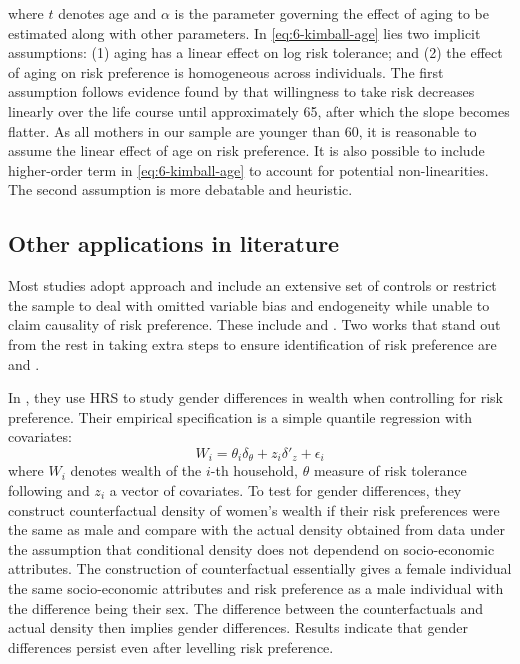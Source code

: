 \documentclass[]{article}
\begin{document}
where $t$ denotes age and $\alpha$ is the parameter governing the effect of aging to be estimated along with other parameters. In  \eqref{eq:6-kimball-age} lies two implicit assumptions: (1) aging has a linear effect on log risk tolerance; and (2) the effect of aging on risk preference is homogeneous across individuals. The first assumption follows evidence found by \citet{dohmen2017} that willingness to take risk decreases linearly over the life course until approximately 65, after which the slope becomes flatter. As all mothers in our sample are younger than 60, it is reasonable to assume the linear effect of age on risk preference. It is also possible to include higher-order term in \eqref{eq:6-kimball-age} to account for potential non-linearities. The second assumption is more debatable and heuristic.  

\subsection{Other applications in literature}
Most studies adopt \citet{kimball2008imputing} approach and include an extensive set of controls or restrict the sample to deal with omitted variable bias and endogeneity while unable to claim causality of risk preference. These include \citet{light2010divorce, brown2011self, brown2012parental, brown2013household} and \citet{yilmazer2015portfolio}. Two works that stand out from the rest in taking extra steps to ensure identification of risk preference are \citet{neelakantan2010gender} and \citet{cho2021endogenous}.

In \citet{neelakantan2010gender}, they use HRS to study gender differences in wealth when controlling for risk preference. Their empirical specification is a simple quantile regression with covariates:
\begin{equation*}
	W_i=\theta_i\delta_\theta+z_i\delta'_z+\epsilon_i
\end{equation*}
where $W_i$ denotes wealth of the $i$-th household, $\theta$ measure of risk tolerance following \citet{kimball2008imputing} and $z_i$ a vector of covariates. To test for gender differences, they construct counterfactual density of women's wealth if their risk preferences were the same as male and compare with the actual density obtained from data under the assumption that conditional density does not dependend on socio-economic attributes. The construction of counterfactual essentially gives a female individual the same socio-economic attributes and risk preference as a male individual with the difference being their sex. The difference between the counterfactuals and actual density then implies gender differences. Results indicate that gender differences persist even after levelling risk preference.
\end{document}
